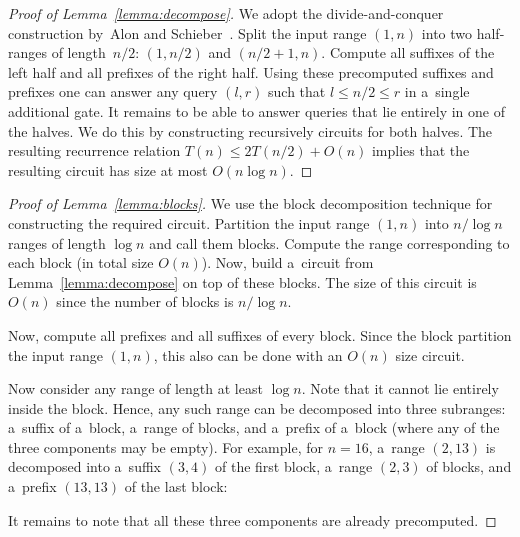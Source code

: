 \documentclass[11pt,letterpaper]{article}
\begin{document}
\begin{proof}[Proof of Lemma~\ref{lemma:decompose}]
We adopt the divide-and-conquer construction by~Alon and Schieber~\cite{Alon87optimalpreprocessing}.
Split the input range $(1,n)$ into two half-ranges of 
length~$n/2$:
$(1,n/2)$ and $(n/2+1,n)$. 
Compute all suffixes of the left half and all prefixes of 
the right half.
Using these precomputed suffixes and 
prefixes one can answer any query $(l,r)$ such that $l \le n/2 
\le r$ in a~single additional gate. It remains to be able to answer 
queries that lie entirely in one of the halves. We do this by 
constructing recursively circuits for both halves. The resulting 
recurrence relation $T(n) \le 2T(n/2)+O(n)$ implies that the
resulting circuit has size at most $O(n\log n)$.
\end{proof}

\begin{proof}[Proof of Lemma~\ref{lemma:blocks}]
We use the block decomposition technique for 
constructing the required circuit.
Partition the input range $(1,n)$ into $n/\log n$ ranges 
of length $\log n$ and call them blocks. Compute the range
corresponding to each block (in total size $O(n)$). 
Now, build a~circuit from Lemma~\ref{lemma:decompose} on 
top of these blocks. The size of this circuit is $O(n)$ since the 
number of blocks is $n/\log n$. 

Now, compute all prefixes and all suffixes of every block. Since
the block partition the input range $(1,n)$, this also can be done 
with an $O(n)$ size circuit.

Now consider any range of length at least $\log n$. Note that it 
cannot lie entirely inside the block. Hence, any such range can be 
decomposed into three subranges: a~suffix of a~block, a~range 
of blocks, and a~prefix of a~block
(where any of the three components may be empty). For example, for $n=16$, 
a~range $(2,13)$ is decomposed into a~suffix $(3,4)$ of the
first block, 
a~range $(2,3)$ of blocks, and a~prefix $(13,13)$ of 
the last block:
\begin{center}
\end{center}
It remains to note that all these three components are already precomputed.
\end{proof}
\end{document}
